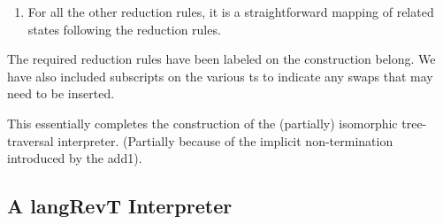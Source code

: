 \documentclass{llncs}
\begin{document}
{\begin{enumerate}
\item For all the other reduction rules, it is a straightforward mapping of
  related states following the reduction rules.

\end{enumerate}

The required reduction rules have been labeled on the construction
belong. We have also included subscripts on the various {{t}}s to
indicate any swaps that may need to be inserted.

\begin{center}
\end{center}

This essentially completes the construction of the (partially)
isomorphic tree-traversal interpreter. (Partially because of the
implicit non-termination introduced by the {{add1}}).


\subsection{A {{langRevT}} Interpreter}

%



}
\end{document}
